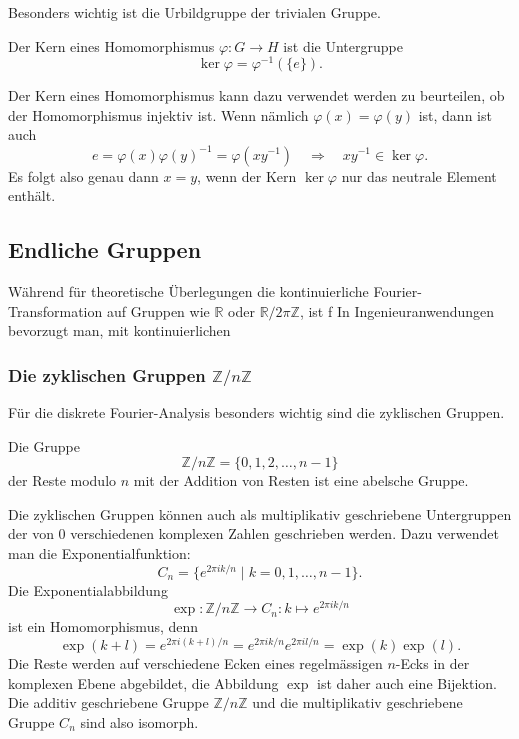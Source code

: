 Besonders wichtig ist die Urbildgruppe der trivialen Gruppe.

\begin{definition}
\label{buch:gruppen:definition:def:kern}
Der Kern eines Homomorphismus $\varphi \colon G\to H$ ist die
Untergruppe
\[
\ker \varphi = \varphi^{-1}(\{e\}).
\]
\end{definition}

Der Kern eines Homomorphismus kann dazu verwendet werden zu beurteilen,
ob der Homomorphismus injektiv ist.
Wenn nämlich $\varphi(x)=\varphi(y)$ ist, dann ist auch
\[
e
=
\varphi(x)\varphi(y)^{-1}
=
\varphi(xy^{-1})
\quad\Rightarrow\quad
xy^{-1} \in\ker\varphi.
\]
Es folgt also genau dann $x=y$, wenn der Kern $\ker\varphi$ nur
das neutrale Element enthält.

%
%
\subsection{Endliche Gruppen
\label{buch:gruppen:subsection:endliche-gruppen}}
Während für theoretische Überlegungen die kontinuierliche
Fourier-Transformation auf Gruppen wie $\mathbb{R}$ oder
$\mathbb{R}/2\pi\mathbb{Z}$, ist f
In Ingenieuranwendungen bevorzugt man, mit kontinuierlichen

\subsubsection{Die zyklischen Gruppen $\mathbb{Z}/n\mathbb{Z}$}
Für die diskrete Fourier-Analysis besonders wichtig sind die zyklischen
Gruppen.

\begin{definition}
\label{buch:gruppen:endliche-gruppen:def:zyklisch}
Die Gruppe
\[
\mathbb{Z}/n\mathbb{Z}
=
\{0,1,2,\dots,n-1\}
\]
der Reste modulo $n$ mit der Addition von Resten ist eine abelsche
Gruppe.
\end{definition}

Die zyklischen Gruppen können auch als multiplikativ geschriebene
Untergruppen der von $0$ verschiedenen komplexen Zahlen geschrieben
werden.
Dazu verwendet man die Exponentialfunktion:
\[
C_n
=
\{ e^{2\pi ik/n}\mid k=0,1,\dots,n-1\}.
\]
Die Exponentialabbildung
\[
\exp
\colon
\mathbb{Z}/n\mathbb{Z}
\to
C_n
:
k\mapsto e^{2\pi ik/n}
\]
ist ein Homomorphismus, denn
\[
\exp(k+l)
=
e^{2\pi i(k+l)/n}
=
e^{2\pi ik/n}
e^{2\pi il/n}
=
\exp(k)\exp(l).
\]
Die Reste werden auf verschiedene Ecken eines regelmässigen
$n$-Ecks in der komplexen Ebene abgebildet, die Abbildung $\exp$
ist daher auch eine Bijektion.
Die additiv geschriebene Gruppe $\mathbb{Z}/n\mathbb{Z}$ und
die multiplikativ geschriebene Gruppe $C_n$ sind also isomorph.

